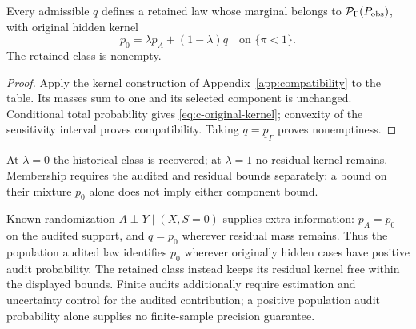\begin{lemma}\label{lem:c-compatible-laws}
Every admissible $q$ defines a retained law whose marginal belongs to
$\mathcal P_\Gamma(P_{\rm obs})$, with original hidden kernel
\begin{equation}
 p_0=\lambda p_A+(1-\lambda)q\quad\text{on }\{\pi<1\}.
 \label{eq:c-original-kernel}
\end{equation}
The retained class is nonempty.
\end{lemma}
\begin{proof}
Apply the kernel construction of Appendix~\ref{app:compatibility} to the table.
Its masses sum to one and its selected component is unchanged. Conditional total
probability gives \eqref{eq:c-original-kernel}; convexity of the sensitivity interval
proves compatibility. Taking $q=\underline p_\Gamma$ proves nonemptiness.
\end{proof}
At $\lambda=0$ the historical class is recovered; at $\lambda=1$ no residual
kernel remains. Membership requires the audited and residual bounds separately:
a bound on their mixture $p_0$ alone does not imply either component bound.

Known randomization $A\perp Y\mid(X,S=0)$ supplies extra information: $p_A=p_0$
on the audited support, and $q=p_0$ wherever residual mass remains. Thus the
population audited law identifies $p_0$ wherever originally hidden cases have
positive audit probability. The retained class instead keeps its residual kernel
free within the displayed bounds. Finite audits additionally require estimation
and uncertainty control for the audited contribution; a positive population audit
probability alone supplies no finite-sample precision guarantee.


